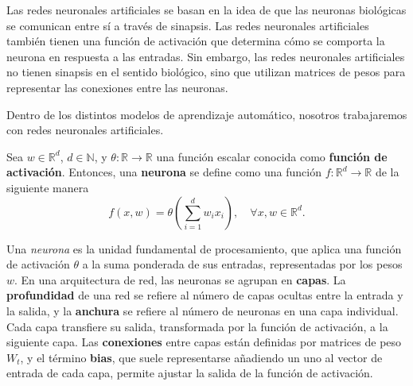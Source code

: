 Las redes neuronales artificiales se basan en la idea de que las neuronas biológicas se comunican entre sí a través de sinapsis. Las redes neuronales artificiales también tienen una función de activación que determina cómo se comporta la neurona en respuesta a las entradas. Sin embargo, las redes neuronales artificiales no tienen sinapsis en el sentido biológico, sino que utilizan matrices de pesos para representar las conexiones entre las neuronas.

Dentro de los distintos modelos de aprendizaje automático, nosotros trabajaremos con redes neuronales artificiales.

\begin{definicion} 
	Sea $w \in \mathbb{R}^d$, $d \in \mathbb{N}$, y $\theta: \mathbb{R} \rightarrow \mathbb{R}$ una función escalar conocida como \textbf{función de activación}. Entonces, una \textbf{neurona} se define como una función $f: \mathbb{R}^d \rightarrow \mathbb{R}$ de la siguiente manera 
	\begin{equation} 
		f(x, w) = \theta \left( \sum_{i=1}^{d} w_i x_i \right), \quad \forall x, w \in \mathbb{R}^d. 
	\end{equation} 
\end{definicion}

Una \textit{neurona} es la unidad fundamental de procesamiento, que aplica una función de activación $\theta$ a la suma ponderada de sus entradas, representadas por los pesos $w$. En una arquitectura de red, las neuronas se agrupan en \textbf{capas}. La \textbf{profundidad} de una red se refiere al número de capas ocultas entre la entrada y la salida, y la \textbf{anchura} se refiere al número de neuronas en una capa individual. Cada capa transfiere su salida, transformada por la función de activación, a la siguiente capa. Las \textbf{conexiones} entre capas están definidas por matrices de peso $W_t$, y el término \textbf{bias}, que suele representarse añadiendo un uno al vector de entrada de cada capa, permite ajustar la salida de la función de activación.

